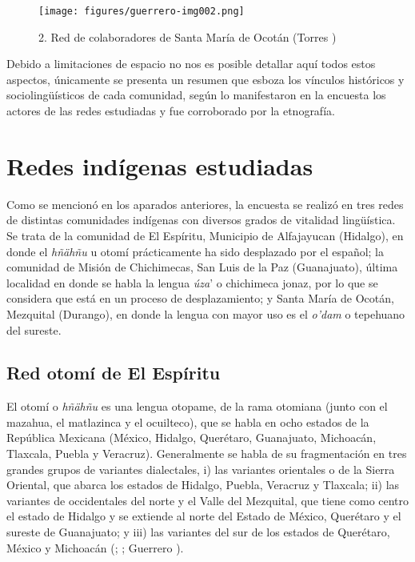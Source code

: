 \documentclass[output=paper]{../langscibook}
\begin{document}
\begin{figure}
\caption{\label{fig:}2. Red de colaboradores de Santa María de Ocotán (Torres \citealt{Sánchez2018})}
\texttt{[image: figures/guerrero-img002.png]}
\end{figure}

Debido a limitaciones de espacio no nos es posible detallar aquí todos estos aspectos, únicamente se presenta un resumen que esboza los vínculos históricos y sociolingüísticos de cada comunidad, según lo manifestaron en la encuesta los actores de las redes estudiadas y fue corroborado por la etnografía.


 \section{Redes indígenas estudiadas}


Como se mencionó en los aparados anteriores, la encuesta se realizó en tres redes de distintas comunidades indígenas con diversos grados de vitalidad lingüística. Se trata de la comunidad de El Espíritu, Municipio de Alfajayucan (Hidalgo), en donde el \textit{hñähñu} u otomí prácticamente ha sido desplazado por el español; la comunidad de Misión de Chichimecas, San Luis de la Paz (Guanajuato), última localidad en donde se habla la lengua \textit{úza}’ o chichimeca jonaz, por lo que se considera que está en un proceso de desplazamiento; y Santa María de Ocotán, Mezquital (Durango), en donde la lengua con mayor uso es el \textit{o’dam} o tepehuano del sureste.



 \subsection{Red otomí de El Espíritu}



El otomí o \textit{hñähñu} es una lengua otopame, de la rama otomiana (junto con el mazahua, el matlazinca y el ocuilteco), que se habla en ocho estados de la República Mexicana (México, Hidalgo, Querétaro, Guanajuato, Michoacán, Tlaxcala, Puebla y Veracruz). Generalmente se habla de su fragmentación en tres grandes grupos de variantes dialectales, i) las variantes orientales o de la Sierra Oriental, que abarca los estados de Hidalgo, Puebla, Veracruz y Tlaxcala; ii) las variantes de occidentales del norte y el Valle del Mezquital, que tiene como centro el estado de Hidalgo y se extiende al norte del Estado de México, Querétaro y el sureste de Guanajuato; y iii) las variantes del sur de los estados de Querétaro, México y Michoacán (\citealt{Soustelle1990}; \citealt{Lastra2006}; Guerrero \citealt{Galván2013}).
\end{document}
